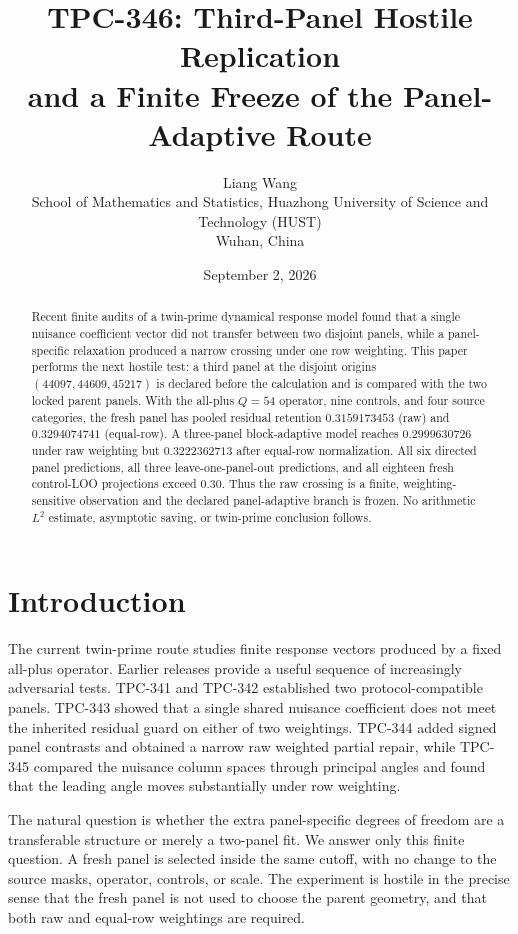 \documentclass[10pt]{article}
\title{\textbf{TPC-346: Third-Panel Hostile Replication\\
and a Finite Freeze of the Panel-Adaptive Route}}
\author{Liang Wang\\
School of Mathematics and Statistics, Huazhong University of Science and
Technology (HUST)\\
Wuhan, China}
\date{September 2, 2026}
\begin{document}
\maketitle

\begin{abstract}
Recent finite audits of a twin-prime dynamical response model found that a
single nuisance coefficient vector did not transfer between two disjoint
panels, while a panel-specific relaxation produced a narrow crossing under
one row weighting.  This paper performs the next hostile test: a third panel
at the disjoint origins $(44097,44609,45217)$ is declared before the
calculation and is compared with the two locked parent panels.  With the
all-plus $Q=54$ operator, nine controls, and four source categories, the
fresh panel has pooled residual retention $0.3159173453$ (raw) and
$0.3294074741$ (equal-row).  A three-panel block-adaptive model reaches
$0.2999630726$ under raw weighting but $0.3222362713$ after equal-row
normalization.  All six directed panel predictions, all three
leave-one-panel-out predictions, and all eighteen fresh control-LOO
projections exceed $0.30$.  Thus the raw crossing is a finite,
weighting-sensitive observation and the declared panel-adaptive branch is
frozen.  No arithmetic $L^2$ estimate, asymptotic saving, or twin-prime
conclusion follows.
\end{abstract}

\section{Introduction}

The current twin-prime route studies finite response vectors produced by a
fixed all-plus operator.  Earlier releases provide a useful sequence of
increasingly adversarial tests.  TPC-341 and TPC-342 established two
protocol-compatible panels.  TPC-343 showed that a single shared nuisance
coefficient does not meet the inherited residual guard on either of two
weightings.  TPC-344 added signed panel contrasts and obtained a narrow raw
weighted partial repair, while TPC-345 compared the nuisance column spaces
through principal angles and found that the leading angle moves substantially
under row weighting.

The natural question is whether the extra panel-specific degrees of freedom
are a transferable structure or merely a two-panel fit.  We answer only this
finite question.  A fresh panel is selected inside the same cutoff, with no
change to the source masks, operator, controls, or scale.  The experiment is
hostile in the precise sense that the fresh panel is not used to choose the
parent geometry, and that both raw and equal-row weightings are required.
\end{document}
